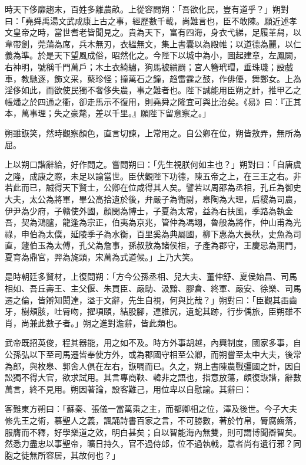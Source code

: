 \begin{pinyinscope}
時天下侈靡趨末，百姓多離農畝。上從容問朔：「吾欲化民，豈有道乎？」朔對曰：「堯舜禹湯文武成康上古之事，經歷數千載，尚難言也，臣不敢陳。願近述孝文皇帝之時，當世耆老皆聞見之。貴為天下，富有四海，身衣弋綈，足履革舄，以韋帶劍，莞蒲為席，兵木無刃，衣縕無文，集上書囊以為殿帷；以道德為麗，以仁義為準。於是天下望風成俗，昭然化之。今陛下以城中為小，圖起建章，左鳳闕，右神明，號稱千門萬戶；木土衣綺繡，狗馬被繢罽；宮人簪玳瑁，垂珠璣；設戲車，教馳逐，飾文采，藂珍怪；撞萬石之鐘，趋雷霆之鼓，作俳優，舞鄭女。上為淫侈如此，而欲使民獨不奢侈失農，事之難者也。陛下誠能用臣朔之計，推甲乙之帳燔之於四通之衢，卻走馬示不復用，則堯舜之隆宜可與比治矣。《易》曰：『正其本，萬事理；失之豪氂，差以千里。』願陛下留意察之。」

朔雖詼笑，然時觀察顏色，直言切諫，上常用之。自公卿在位，朔皆敖弄，無所為屈。

上以朔口諧辭給，好作問之。嘗問朔曰：「先生視朕何如主也？」朔對曰：「自唐虞之隆，成康之際，未足以諭當世。臣伏觀陛下功德，陳五帝之上，在三王之右。非若此而已，誠得天下賢士，公卿在位咸得其人矣。譬若以周邵為丞相，孔丘為御史大夫，太公為將軍，畢公高拾遺於後，弁嚴子為衛尉，皋陶為大理，后稷為司農，伊尹為少府，子贛使外國，顏閔為博士，子夏為太常，益為右扶風，季路為執金吾，契為鴻臚，龍逢為宗正，伯夷為京兆，管仲為馮翊，魯般為將作，仲山甫為光祿，申伯為太僕，延陵季子為水衡，百里奚為典屬國，柳下惠為大長秋，史魚為司直，蘧伯玉為太傅，孔父為詹事，孫叔敖為諸侯相，子產為郡守，王慶忌為期門，夏育為鼎官，羿為旄頭，宋萬為式道候。」上乃大笑。

是時朝廷多賢材，上復問朔：「方今公孫丞相、兒大夫、董仲舒、夏侯始昌、司馬相如、吾丘壽王、主父偃、朱買臣、嚴助、汲黯、膠倉、終軍、嚴安、徐樂、司馬遷之倫，皆辯知閎達，溢于文辭，先生自視，何與比哉？」朔對曰：「臣觀其臿齒牙，樹頰胲，吐脣吻，擢項頤，結股腳，連脽尻，遺蛇其跡，行步偊旅，臣朔雖不肖，尚兼此數子者。」朔之進對澹辭，皆此類也。

武帝既招英俊，程其器能，用之如不及。時方外事胡越，內興制度，國家多事，自公孫弘以下至司馬遷皆奉使方外，或為郡國守相至公卿，而朔嘗至太中大夫，後常為郎，與枚皋、郭舍人俱在左右，詼啁而已。久之，朔上書陳農戰彊國之計，因自訟獨不得大官，欲求試用。其言專商鞅、韓非之語也，指意放蕩，頗復詼諧，辭數萬言，終不見用。朔因著論，設客難己，用位卑以自慰諭。其辭曰：

客難東方朔曰：「蘇秦、張儀一當萬乘之主，而都卿相之位，澤及後世。今子大夫修先王之術，慕聖人之義，諷誦詩書百家之言，不可勝數，著於竹帛，脣腐齒落，服膺而不釋，好學樂道之效，明白甚矣；自以智能海內無雙，則可謂博聞辯智矣。然悉力盡忠以事聖帝，曠日持久，官不過侍郎，位不過執戟，意者尚有遺行邪？同胞之徒無所容居，其故何也？」


\end{pinyinscope}
